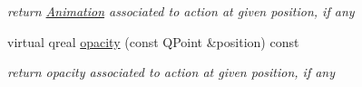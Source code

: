 \begin{DoxyCompactItemize}
\begin{DoxyCompactList}\small\item\em return \hyperlink{class_animation}{Animation} associated to action at given position, if any \end{DoxyCompactList}\item 
\mbox{\label{class_header_view_data_aff37d66d79042606e33142b41a2f5f31}} 
virtual qreal \hyperlink{class_header_view_data_aff37d66d79042606e33142b41a2f5f31}{opacity} (const Q\+Point \&position) const
\begin{DoxyCompactList}\small\item\em return opacity associated to action at given position, if any \end{DoxyCompactList}\end{DoxyCompactItemize}

